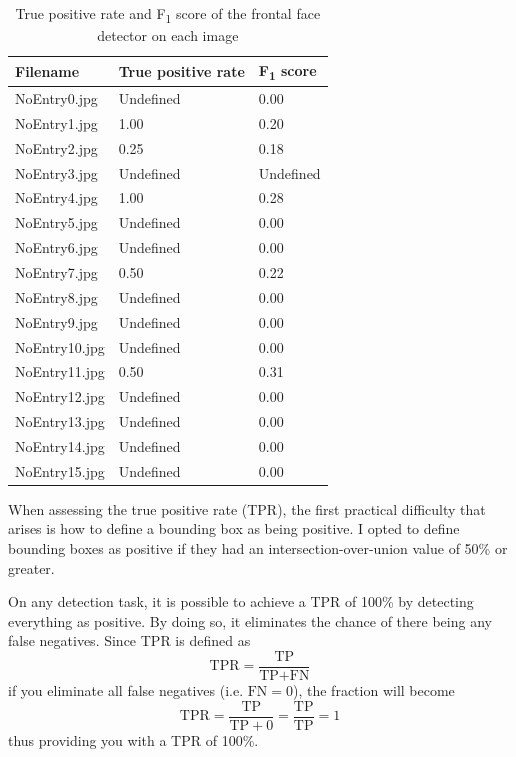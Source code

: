 \documentclass[onecolumn, 11pt, a4paper]{article}
\begin{document}
\begin{table}
  \begin{center}
  \caption{True positive rate and F\textsubscript{1} score of the frontal face detector on each image}\label{tab:face}
  \begin{tabular}{l l l} 
    \hline\hline
    Filename & True positive rate & F\textsubscript{1} score\\
    \hline
    NoEntry0.jpg & Undefined & 0.00 \\ 
    NoEntry1.jpg & 1.00 & 0.20 \\ 
    NoEntry2.jpg & 0.25 & 0.18 \\ 
    NoEntry3.jpg & Undefined & Undefined \\ 
    NoEntry4.jpg & 1.00 & 0.28 \\ 
    NoEntry5.jpg & Undefined & 0.00 \\ 
    NoEntry6.jpg & Undefined & 0.00 \\ 
    NoEntry7.jpg & 0.50 & 0.22 \\ 
    NoEntry8.jpg & Undefined & 0.00 \\ 
    NoEntry9.jpg & Undefined & 0.00 \\ 
    NoEntry10.jpg & Undefined & 0.00 \\ 
    NoEntry11.jpg & 0.50 & 0.31 \\ 
    NoEntry12.jpg & Undefined & 0.00 \\ 
    NoEntry13.jpg & Undefined & 0.00 \\ 
    NoEntry14.jpg & Undefined & 0.00 \\ 
    NoEntry15.jpg & Undefined & 0.00 \\ 
    \hline
  \end{tabular}
  \end{center}
\end{table} 

When assessing the true positive rate (TPR), the first practical difficulty that arises is how to define a bounding box as being positive.
I opted to define bounding boxes as positive if they had an intersection-over-union value of 50\% or greater.

On any detection task, it is possible to achieve a TPR of 100\% by detecting everything as positive.
By doing so, it eliminates the chance of there being any false negatives. 
Since TPR is defined as \[\text{TPR} = \frac{\text{TP}}{\text{TP} + \text{FN}}\]
if you eliminate all false negatives (i.e. $\text{FN} = 0$), the fraction will become
\[\text{TPR} = \frac{\text{TP}}{\text{TP} + 0} = \frac{\text{TP}}{\text{TP}} = 1\]
thus providing you with a TPR of 100\%.
\end{document}
